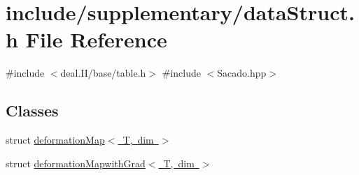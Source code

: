 \section{include/supplementary/data\+Struct.h File Reference}
\label{data_struct_8h}
{\ttfamily \#include $<$deal.\+I\+I/base/table.\+h$>$}\newline
{\ttfamily \#include $<$Sacado.\+hpp$>$}\newline
\subsection*{Classes}
\begin{DoxyCompactItemize}
\item 
struct \mbox{\hyperlink{structdeformation_map}{deformation\+Map$<$ T, dim $>$}}
\item 
struct \mbox{\hyperlink{structdeformation_mapwith_grad}{deformation\+Mapwith\+Grad$<$ T, dim $>$}}
\end{DoxyCompactItemize}
